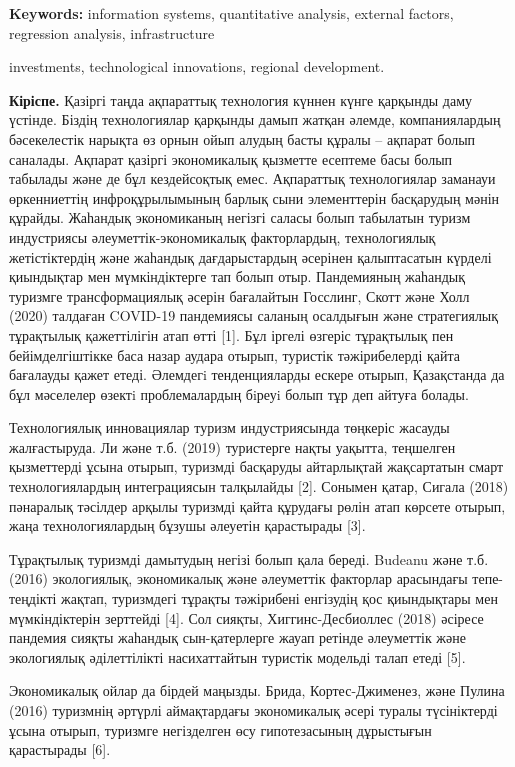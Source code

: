 {\bfseries Keywords:} information systems, quantitative analysis, external
factors, regression analysis, infrastructure

investments, technological
innovations, regional development.

\begin{multicols}{2}
{\bfseries Кіріспе.} Қазіргі таңда ақпараттық технология күннен күнге
қарқынды даму үстінде. Біздің технологиялар қарқынды дамып жатқан
әлемде, компаниялардың бәсекелестік нарықта өз орнын ойып алудың басты
құралы -- ақпарат болып саналады. Ақпарат қазіргі экономикалық қызметте
есептеме басы болып табылады және де бұл кездейсоқтық емес. Ақпараттық
технологиялар заманауи өркенниеттің инфроқұрылымының барлық сыни
элементтерін басқарудың мәнін құрайды. Жаһандық экономиканың негізгі
саласы болып табылатын туризм индустриясы әлеуметтік-экономикалық
факторлардың, технологиялық жетістіктердің және жаһандық дағдарыстардың
әсерінен қалыптасатын күрделі қиындықтар мен мүмкіндіктерге тап болып
отыр. Пандемияның жаһандық туризмге трансформациялық әсерін бағалайтын
Госслинг, Скотт және Холл (2020) талдаған COVID-19 пандемиясы саланың
осалдығын және стратегиялық тұрақтылық қажеттілігін атап өтті {[}1{]}.
Бұл іргелі өзгеріс тұрақтылық пен бейімделгіштікке баса назар аудара
отырып, туристік тәжірибелерді қайта бағалауды қажет етеді. Әлемдегi
тенденцияларды ескере отырып, Қазақстанда да бұл мәселелер өзектi
проблемалардың бiреуi болып тұр деп айтуға болады.

Технологиялық инновациялар туризм индустриясында төңкеріс жасауды
жалғастыруда. Ли және т.б. (2019) туристерге нақты уақытта, теңшелген
қызметтерді ұсына отырып, туризмді басқаруды айтарлықтай жақсартатын
смарт технологиялардың интеграциясын талқылайды {[}2{]}. Сонымен қатар,
Сигала (2018) пәнаралық тәсілдер арқылы туризмді қайта құрудағы рөлін
атап көрсете отырып, жаңа технологиялардың бұзушы әлеуетін қарастырады
{[}3{]}.

Тұрақтылық туризмді дамытудың негізі болып қала береді. Budeanu және
т.б. (2016) экологиялық, экономикалық және әлеуметтік факторлар
арасындағы тепе-теңдікті жақтап, туризмдегі тұрақты тәжірибені енгізудің
қос қиындықтары мен мүмкіндіктерін зерттейді {[}4{]}. Сол сияқты,
Хиггинс-Десбиоллес (2018) әсіресе пандемия сияқты жаһандық
сын-қатерлерге жауап ретінде әлеуметтік және экологиялық әділеттілікті
насихаттайтын туристік модельді талап етеді {[}5{]}.

Экономикалық ойлар да бірдей маңызды. Брида, Кортес-Джименез, және
Пулина (2016) туризмнің әртүрлі аймақтардағы экономикалық әсері туралы
түсініктерді ұсына отырып, туризмге негізделген өсу гипотезасының
дұрыстығын қарастырады {[}6{]}.


\end{multicols}
